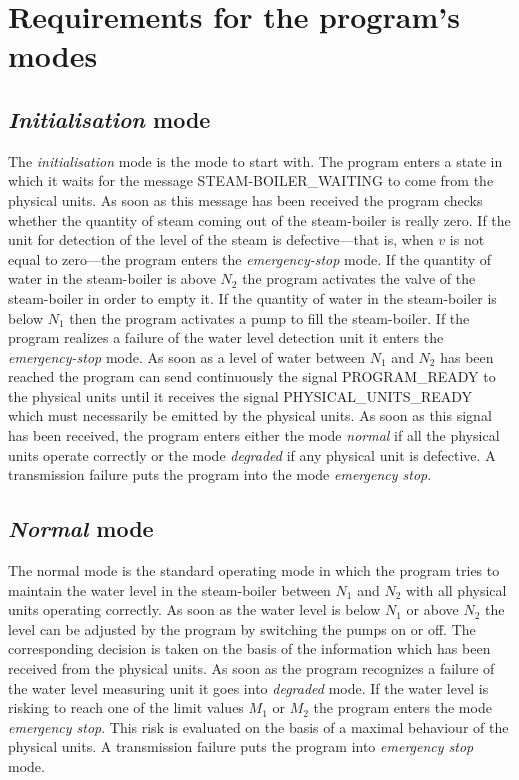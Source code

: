 \documentclass{report}
\begin{document}

\appendix

\chapter{Requirements for the program's modes}
\label{appendix:requirements}

\section{\emph{Initialisation} mode}

The \emph{initialisation} mode is the mode to start with.  The program
enters a state in which it waits for the message STEAM-BOILER\_WAITING
to come from the physical units.  As soon as this message has been
received the program checks whether the quantity of steam coming out
of the steam-boiler is really zero.  If the unit for detection of the
level of the steam is defective---that is, when \( v \)\/ is not equal
to zero---the program enters the \emph{emergency-stop} mode.  If the
quantity of water in the steam-boiler is above \( N_2 \)\/ the program
activates the valve of the steam-boiler in order to empty it.  If the
quantity of water in the steam-boiler is below \( N_1 \)\/ then the
program activates a pump to fill the steam-boiler.  If the program
realizes a failure of the water level detection unit it enters the
\emph{emergency-stop} mode.  As soon as a level of water between \(
N_1 \)\/ and \( N_2 \)\/ has been reached the program can send
continuously the signal PROGRAM\_READY to the physical units until it
receives the signal PHYSICAL\_UNITS\_READY which must necessarily be
emitted by the physical units.  As soon as this signal has been
received, the program enters either the mode \emph{normal} if all the
physical units operate correctly or the mode \emph{degraded} if any
physical unit is defective.  A transmission failure puts the program
into the mode \emph{emergency stop}.

\section{\emph{Normal} mode}

The normal mode is the standard operating mode in which the program
tries to maintain the water level in the steam-boiler between \(N_1
\)\/ and \( N_2 \)\/ with all physical units operating correctly.  As
soon as the water level is below \( N_1 \)\/ or above \( N_2 \)\/ the
level can be adjusted by the program by switching the pumps on or off.
The corresponding decision is taken on the basis of the information
which has been received from the physical units.  As soon as the
program recognizes a failure of the water level measuring unit it goes
into \emph{degraded} mode.  If the water level is risking to reach one
of the limit values \( M_1 \)\/ or \( M_2 \)\/ the program enters the
mode \emph{emergency stop}.  This risk is evaluated on the basis of a
maximal behaviour of the physical units.  A transmission failure puts
the program into \emph{emergency stop} mode.
\end{document}
